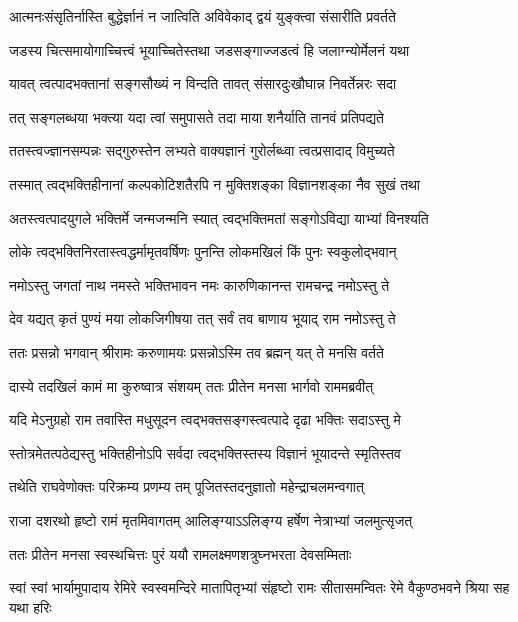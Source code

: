 \twolineshloka
{आत्मनःसंसृतिर्नास्ति बुद्धेर्ज्ञानं न जात्विति}
{अविवेकाद् द्वयं युङ्क्त्वा संसारीति प्रवर्तते} %

\twolineshloka
{जडस्य चित्समायोगाच्चित्त्वं भूयाच्चितेस्तथा}
{जडसङ्गाज्जडत्वं हि जलाग्न्योर्मेलनं यथा} %

\twolineshloka
{यावत् त्वत्पादभक्तानां सङ्गसौख्यं न विन्दति}
{तावत् संसारदुःखौघान्न निवर्तेन्नरः सदा} %

\twolineshloka
{तत् सङ्गलब्धया भक्त्या यदा त्वां समुपासते}
{तदा माया शनैर्याति तानवं प्रतिपद्यते} %

\twolineshloka
{ततस्त्वज्ज्ञानसम्पन्नः सद्गुरुस्तेन लभ्यते}
{वाक्यज्ञानं गुरोर्लब्ध्वा त्वत्प्रसादाद् विमुच्यते} %

\twolineshloka
{तस्मात् त्वद्भक्तिहीनानां कल्पकोटिशतैरपि}
{न मुक्तिशङ्का विज्ञानशङ्का नैव सुखं तथा} %

\twolineshloka
{अतस्त्वत्पादयुगले भक्तिर्मे जन्मजन्मनि}
{स्यात् त्वद्भक्तिमतां सङ्गोऽविद्या याभ्यां विनश्यति} %

\twolineshloka
{लोके त्वद्भक्तिनिरतास्त्वद्धर्मामृतवर्षिणः}
{पुनन्ति लोकमखिलं किं पुनः स्वकुलोद्भवान्} %

\twolineshloka
{नमोऽस्तु जगतां नाथ नमस्ते भक्तिभावन}
{नमः कारुणिकानन्त रामचन्द्र नमोऽस्तु ते} %

\twolineshloka
{देव यद्यत् कृतं पुण्यं मया लोकजिगीषया}
{तत् सर्वं तव बाणाय भूयाद् राम नमोऽस्तु ते} %

\twolineshloka
{ततः प्रसन्नो भगवान् श्रीरामः करुणामयः}
{प्रसन्नोऽस्मि तव ब्रह्मन् यत् ते मनसि वर्तते} %

\twolineshloka
{दास्ये तदखिलं कामं मा कुरुष्वात्र संशयम्}
{ततः प्रीतेन मनसा भार्गवो राममब्रवीत्} %

\twolineshloka
{यदि मेऽनुग्रहो राम तवास्ति मधुसूदन}
{त्वद्भक्तसङ्गस्त्वत्पादे दृढा भक्तिः सदाऽस्तु मे} %

\twolineshloka
{स्तोत्रमेतत्पठेद्यस्तु भक्तिहीनोऽपि सर्वदा}
{त्वद्भक्तिस्तस्य विज्ञानं भूयादन्ते स्मृतिस्तव} %

\twolineshloka
{तथेति राघवेणोक्तः परिक्रम्य प्रणम्य तम्}
{पूजितस्तदनुज्ञातो महेन्द्राचलमन्वगात्} %

\twolineshloka
{राजा दशरथो हृष्टो रामं मृतमिवागतम्}
{आलिङ्ग्याऽऽलिङ्ग्य हर्षेण नेत्राभ्यां जलमुत्सृजत्} %

\twolineshloka
{ततः प्रीतेन मनसा स्वस्थचित्तः पुरं ययौ}
{रामलक्ष्मणशत्रुघ्नभरता देवसम्मिताः} %

\threelineshloka
{स्वां स्वां भार्यामुपादाय रेमिरे स्वस्वमन्दिरे}
{मातापितृभ्यां संहृष्टो रामः सीतासमन्वितः}
{रेमे वैकुण्ठभवने श्रिया सह यथा हरिः} %

